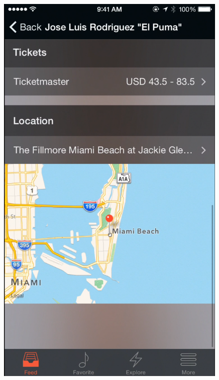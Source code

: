 \begin{figure}
\begin{minipage}{.5\textwidth}
        		\includegraphics[width=.7\linewidth]{./pics/app4.png}
        	\end{minipage}
        \end{figure}		

